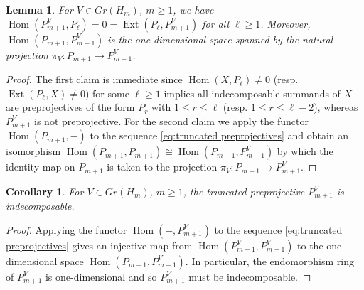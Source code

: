 \documentclass{amsart}
\newtheorem{corollary}[theorem]{Corollary}
\newtheorem{lemma}[theorem]{Lemma}
\newcommand{\Ext}{\operatorname{Ext}}
\newcommand{\Hom}{\operatorname{Hom}}
\begin{document}
\begin{lemma}
  \label{le:basic homological properties}
  For $V\in Gr(H_m)$, $m\ge1$, we have $\Hom(P_{m+1}^V,P_\ell)=0=\Ext(P_\ell,P_{m+1}^V)$ for all $\ell\ge1$.
  Moreover, $\Hom(P_{m+1},P_{m+1}^V)$ is the one-dimensional space spanned by the natural projection $\pi_V:P_{m+1}\to P_{m+1}^V$.
\end{lemma}
\begin{proof}
  The first claim is immediate since $\Hom(X,P_\ell)\ne0$ (resp. $\Ext(P_\ell,X)\ne0$) for some $\ell\ge1$ implies all indecomposable summands of $X$ are preprojectives of the form $P_r$ with $1\le r\le\ell$ (resp. $1\le r\le\ell-2$), whereas $P_{m+1}^V$ is not preprojective.
  For the second claim we apply the functor $\Hom(P_{m+1},-)$ to the sequence \eqref{eq:truncated preprojectives} and obtain an isomorphism $\Hom(P_{m+1},P_{m+1})\cong\Hom(P_{m+1},P_{m+1}^V)$ by which the identity map on $P_{m+1}$ is taken to the projection $\pi_V:P_{m+1}\to P_{m+1}^V$.
\end{proof}

\begin{corollary}
  For $V\in Gr(H_m)$, $m\ge1$, the truncated preprojective $P_{m+1}^V$ is indecomposable.
\end{corollary}
\begin{proof}
  Applying the functor $\Hom(-,P_{m+1}^V)$ to the sequence \eqref{eq:truncated preprojectives} gives an injective map from $\Hom(P_{m+1}^V,P_{m+1}^V)$ to the one-dimensional space $\Hom(P_{m+1},P_{m+1}^V)$.
  In particular, the endomorphism ring of $P_{m+1}^V$ is one-dimensional and so $P_{m+1}^V$ must be indecomposable.
\end{proof}
\end{document}
